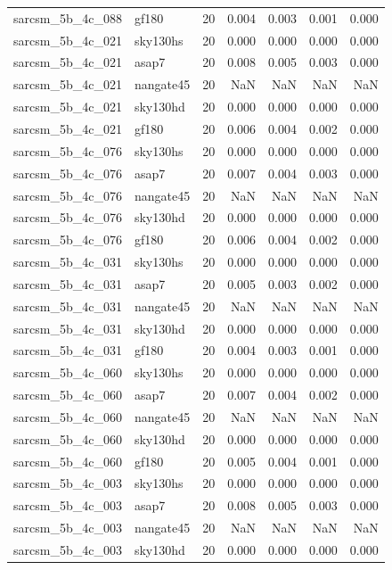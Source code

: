 \begin{tabular}{llrrrrr}
sarcsm\_5b\_4c\_088 & gf180 & 20 & 0.004 & 0.003 & 0.001 & 0.000 \\
sarcsm\_5b\_4c\_021 & sky130hs & 20 & 0.000 & 0.000 & 0.000 & 0.000 \\
sarcsm\_5b\_4c\_021 & asap7 & 20 & 0.008 & 0.005 & 0.003 & 0.000 \\
sarcsm\_5b\_4c\_021 & nangate45 & 20 & NaN & NaN & NaN & NaN \\
sarcsm\_5b\_4c\_021 & sky130hd & 20 & 0.000 & 0.000 & 0.000 & 0.000 \\
sarcsm\_5b\_4c\_021 & gf180 & 20 & 0.006 & 0.004 & 0.002 & 0.000 \\
sarcsm\_5b\_4c\_076 & sky130hs & 20 & 0.000 & 0.000 & 0.000 & 0.000 \\
sarcsm\_5b\_4c\_076 & asap7 & 20 & 0.007 & 0.004 & 0.003 & 0.000 \\
sarcsm\_5b\_4c\_076 & nangate45 & 20 & NaN & NaN & NaN & NaN \\
sarcsm\_5b\_4c\_076 & sky130hd & 20 & 0.000 & 0.000 & 0.000 & 0.000 \\
sarcsm\_5b\_4c\_076 & gf180 & 20 & 0.006 & 0.004 & 0.002 & 0.000 \\
sarcsm\_5b\_4c\_031 & sky130hs & 20 & 0.000 & 0.000 & 0.000 & 0.000 \\
sarcsm\_5b\_4c\_031 & asap7 & 20 & 0.005 & 0.003 & 0.002 & 0.000 \\
sarcsm\_5b\_4c\_031 & nangate45 & 20 & NaN & NaN & NaN & NaN \\
sarcsm\_5b\_4c\_031 & sky130hd & 20 & 0.000 & 0.000 & 0.000 & 0.000 \\
sarcsm\_5b\_4c\_031 & gf180 & 20 & 0.004 & 0.003 & 0.001 & 0.000 \\
sarcsm\_5b\_4c\_060 & sky130hs & 20 & 0.000 & 0.000 & 0.000 & 0.000 \\
sarcsm\_5b\_4c\_060 & asap7 & 20 & 0.007 & 0.004 & 0.002 & 0.000 \\
sarcsm\_5b\_4c\_060 & nangate45 & 20 & NaN & NaN & NaN & NaN \\
sarcsm\_5b\_4c\_060 & sky130hd & 20 & 0.000 & 0.000 & 0.000 & 0.000 \\
sarcsm\_5b\_4c\_060 & gf180 & 20 & 0.005 & 0.004 & 0.001 & 0.000 \\
sarcsm\_5b\_4c\_003 & sky130hs & 20 & 0.000 & 0.000 & 0.000 & 0.000 \\
sarcsm\_5b\_4c\_003 & asap7 & 20 & 0.008 & 0.005 & 0.003 & 0.000 \\
sarcsm\_5b\_4c\_003 & nangate45 & 20 & NaN & NaN & NaN & NaN \\
sarcsm\_5b\_4c\_003 & sky130hd & 20 & 0.000 & 0.000 & 0.000 & 0.000 \\

\end{tabular}
